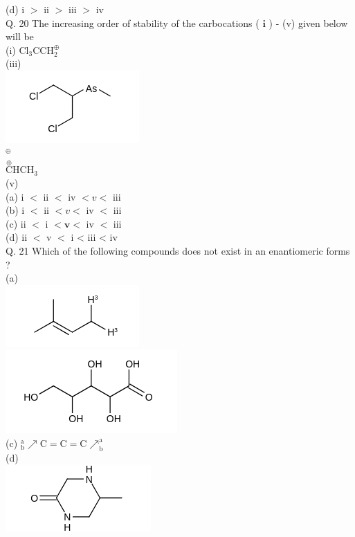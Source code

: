 \documentclass[10pt]{article}
\begin{document}
(d) i $>$ ii $>$ iii $>$ iv\\
Q. 20 The increasing order of stability of the carbocations ( $\mathbf{i}$ ) - (v) given below will be\\
(i) $\mathrm{Cl}_{3} \mathrm{CCH}_{2}^{\oplus}$\\
(iii)\\
\includegraphics{smile-f0dfd65f40b7d81d3739a4304c65e671d29b83c1}\\
${ }^{\oplus}$\\
$\stackrel{\oplus}{\mathrm{C}} \mathrm{HCH}_{3}$\\
(v)\\
(a) i $<$ ii $<$ iv $<v<$ iii\\
(b) i $<$ ii $<v<$ iv $<$ iii\\
(c) ii $<$ i $<\mathbf{v}<$ iv $<$ iii\\
(d) ii $<$ v $<$ i < iii < iv\\
Q. 21 Which of the following compounds does not exist in an enantiomeric forms ?\\
(a)\\
\includegraphics{smile-bdc12aa0043609fc6504385cc16a059c9298dbd4}\\
\includegraphics{smile-be8a77a3f395cf6b70137fe8e9252514996d0c13}\\
(c) ${ }_{\mathrm{b}}^{\mathrm{a}} \nearrow \mathrm{C}=\mathrm{C}=\mathrm{C} \nearrow_{\mathrm{b}}^{\mathrm{a}}$\\
(d)\\
\includegraphics{smile-f5674cc8bf5763332e24b013c6ed89daea575caa}\\
\end{document}
